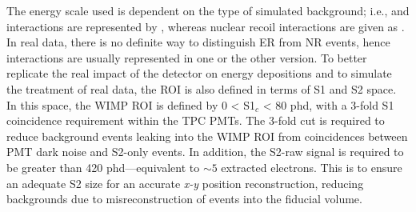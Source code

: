 The energy scale used is dependent on the type of simulated background; i.e., \beta and \gamma interactions are represented by \kevee{}, whereas nuclear recoil interactions are given as \kevnr{}. In real data, there is no definite way to distinguish ER from NR events, hence interactions are usually represented in one or the other version. To better replicate the real impact of the detector on energy depositions and to simulate the treatment of real data, the ROI is also defined in terms of S1 and S2 space. In this space, the WIMP ROI is defined by 0 < S1$_{c}$ < 80 phd, with a 3-fold S1 coincidence requirement within the TPC PMTs. The 3-fold cut is required to reduce background events leaking into the WIMP ROI from coincidences between PMT dark noise and S2-only events. In addition, the S2-raw signal is required to be greater than 420 phd---equivalent to $\sim5$ extracted electrons. This is to ensure an adequate S2 size for an accurate \textit{x-y} position reconstruction, reducing backgrounds due to misreconstruction of events into the fiducial volume.

